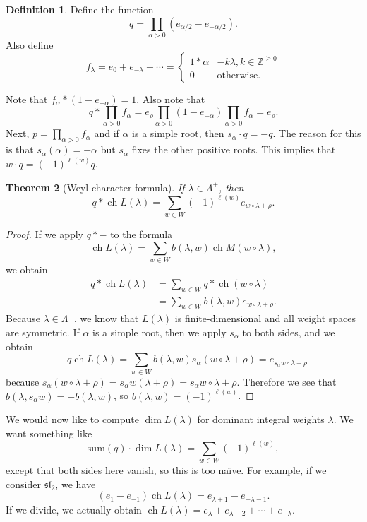 \documentclass[leqno, openany]{memoir}
\newtheorem{thm}{Theorem}[section]
\theoremstyle{definition}
\newtheorem{defn}[thm]{Definition}
\theoremstyle{remark}
\theoremstyle{plain}
\theoremstyle{definition}
\theoremstyle{remark}
\newcommand{\Z}{\mathbb{Z}}
\newcommand{\mf}[1]{\mathfrak{#1}}
\newcommand{\mr}[1]{\mathrm{#1}}
\DeclareMathOperator{\ch}{ch}
\begin{document}
\begin{defn}
    Define the function
    \[ q = \prod_{\alpha > 0} (e_{\alpha/2} - e_{-\alpha/2}). \]
    Also define 
    \[ f_{\lambda} = e_0 + e_{-\lambda} + \cdots = \begin{cases}
        1 * \alpha & -k \lambda, k \in \Z^{\geq 0} \\
        0 & \text{otherwise}.
    \end{cases}\]
\end{defn}
Note that $f_{\alpha} * (1- e_{-\alpha}) = 1$. Also note that
\[ q * \prod_{\alpha > 0} f_{\alpha} = e_{\rho} \prod_{\alpha > 0} (1-e_{-\alpha}) \prod_{\alpha > 0} f_{\alpha} = e_{\rho}. \]
Next, $p = \prod_{\alpha > 0} f_{\alpha}$ and if $\alpha$ is a simple root, then $s_{\alpha} \cdot q = -q$. The reason for this is that $s_{\alpha} (\alpha) = -\alpha$ but $s_\alpha$ fixes the other positive roots. This implies that $w \cdot q = {(-1)}^{\ell(w)} q$.

\begin{thm}[Weyl character formula]
    If $\lambda \in \Lambda^+$, then
    \[ q * \ch L(\lambda) = \sum_{w \in W} {(-1)}^{\ell(w)} e_{w \circ \lambda + \rho}. \]
\end{thm}

\begin{proof}
    If we apply $q * -$ to the formula
    \[ \ch L(\lambda) = \sum_{w \in W} b(\lambda, w) \ch M(w \circ \lambda), \]
    we obtain
    \begin{align*} 
        q * \ch L(\lambda) &= \sum_{w \in W} q * \ch(w \circ \lambda) \\
        &= \sum_{w \in W} b(\lambda, w) e_{w \circ \lambda + \rho}.
    \end{align*}
    Because $\lambda \in \Lambda^+$, we know that $L(\lambda)$ is finite-dimensional and all weight spaces are symmetric. If $\alpha$ is a simple root, then we apply $s_{\alpha}$ to both sides, and we obtain
    \[ -q \ch L(\lambda) = \sum_{w \in W} b(\lambda, w) s_{\alpha} (w \circ \lambda + \rho) = e_{s_{\alpha}w \circ \lambda + \rho} \]
    because $s_{\alpha}(w \circ \lambda + \rho) = s_{\alpha} w(\lambda + \rho) = s_{\alpha} w \circ \lambda + \rho$. Therefore we see that $b(\lambda, s_{\alpha} w) = -b(\lambda, w)$, so $b(\lambda, w) = {(-1)}^{\ell(w)}$.
\end{proof}

We would now like to compute $\dim L(\lambda)$ for dominant integral weights $\lambda$. We want something like
\[ \mr{sum}(q) \cdot \dim L(\lambda) = \sum_{w \in W} {(-1)}^{\ell(w)}, \]
except that both sides here vanish, so this is too na\"{\i}ve. For example, if we consider $\mf{sl}_2$, we have
\[ (e_1 - e_{-1}) \ch L(\lambda) = e_{\lambda+1} - e_{-\lambda-1}. \]
If we divide, we actually obtain $\ch L(\lambda) = e_{\lambda} + e_{\lambda - 2} + \cdots + e_{- \lambda}$.
\end{document}
